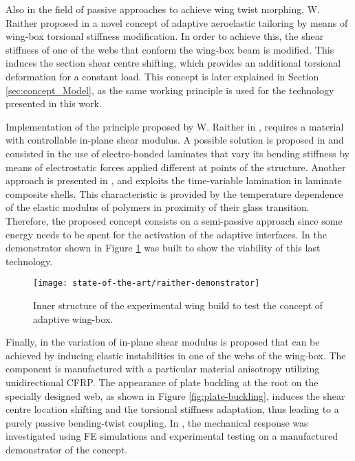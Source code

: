   Also in the field of passive approaches to achieve wing twist morphing, W. Raither proposed in \cite{Raither2013a} a novel concept of adaptive aeroelastic tailoring by means of wing-box torsional stiffness modification. In order to achieve this, the shear stiffness of one of the webs that conform the wing-box beam is modified. This induces the section shear centre shifting, which provides an additional torsional deformation for a constant load. This concept is later explained in Section \ref{sec:concept_Model}, as the same working principle is used for the technology presented in this work.

  Implementation of the principle proposed by W. Raither in \cite{Raither2013a}, requires a material with controllable in-plane shear modulus. A possible solution is proposed in \cite{Bergamini2006} and consisted in the use of electro-bonded laminates that vary its bending stiffness by means of electrostatic forces applied different at points of the structure. Another approach is presented in \cite{Raither2012}, and exploits the time-variable lamination in laminate composite shells. This characteristic is provided by the temperature dependence of the elastic modulus of polymers in proximity of their glass transition. Therefore, the proposed concept consists on a semi-passive approach since some energy needs to be spent for the activation of the adaptive interfaces. In \cite{Raither2013} the demonstrator shown in Figure \ref{fig:raither-demonstrator} was built to show the viability of this last technology.

  \begin{figure}[!htpb]
    \centering
    \texttt{[image: state-of-the-art/raither-demonstrator]}
    \caption[Inner structure of the experimental wing build to test the concept of adaptive wing-box]{Inner structure of the experimental wing build to test the concept of adaptive wing-box. \cite{Raither2013}}\label{fig:raither-demonstrator}
  \end{figure}

  Finally, in \cite{Runkel2016} the variation of in-plane shear modulus is proposed that can be achieved by inducing elastic instabilities in one of the webs of the wing-box. The component is manufactured with a particular material anisotropy utilizing unidirectional CFRP. The appearance of plate buckling at the root on the specially designed web, as shown in Figure \ref{fig:plate-buckling}, induces the shear centre location shifting and the torsional stiffness adaptation, thus leading to a purely passive bending-twist coupling. In \cite{Andreas2015}, the mechanical response was investigated using FE simulations and experimental testing on a manufactured demonstrator of the concept.


